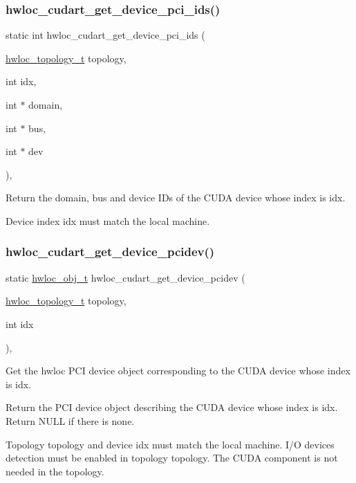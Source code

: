 \subsubsection{\texorpdfstring{hwloc\+\_\+cudart\+\_\+get\+\_\+device\+\_\+pci\+\_\+ids()}{hwloc\_cudart\_get\_device\_pci\_ids()}}
{\footnotesize\ttfamily static int hwloc\+\_\+cudart\+\_\+get\+\_\+device\+\_\+pci\+\_\+ids (\begin{DoxyParamCaption}\item[{\hyperlink{a00186_ga9d1e76ee15a7dee158b786c30b6a6e38}{hwloc\+\_\+topology\+\_\+t}}]{topology,  }\item[{int}]{idx,  }\item[{int $\ast$}]{domain,  }\item[{int $\ast$}]{bus,  }\item[{int $\ast$}]{dev }\end{DoxyParamCaption})\hspace{0.3cm}{\ttfamily [inline]}, {\ttfamily [static]}}



Return the domain, bus and device I\+Ds of the C\+U\+DA device whose index is {\ttfamily idx}. 

Device index {\ttfamily idx} must match the local machine. \mbox{\label{a00220_gaeda4e6efbb36b518b2c286434ad23bb2}} 
\subsubsection{\texorpdfstring{hwloc\+\_\+cudart\+\_\+get\+\_\+device\+\_\+pcidev()}{hwloc\_cudart\_get\_device\_pcidev()}}
{\footnotesize\ttfamily static \hyperlink{a00185_ga79b8ab56877ef99ac59b833203391c7d}{hwloc\+\_\+obj\+\_\+t} hwloc\+\_\+cudart\+\_\+get\+\_\+device\+\_\+pcidev (\begin{DoxyParamCaption}\item[{\hyperlink{a00186_ga9d1e76ee15a7dee158b786c30b6a6e38}{hwloc\+\_\+topology\+\_\+t}}]{topology,  }\item[{int}]{idx }\end{DoxyParamCaption})\hspace{0.3cm}{\ttfamily [inline]}, {\ttfamily [static]}}



Get the hwloc P\+CI device object corresponding to the C\+U\+DA device whose index is {\ttfamily idx}. 

Return the P\+CI device object describing the C\+U\+DA device whose index is {\ttfamily idx}. Return N\+U\+LL if there is none.

Topology {\ttfamily topology} and device {\ttfamily idx} must match the local machine. I/O devices detection must be enabled in topology {\ttfamily topology}. The C\+U\+DA component is not needed in the topology. 